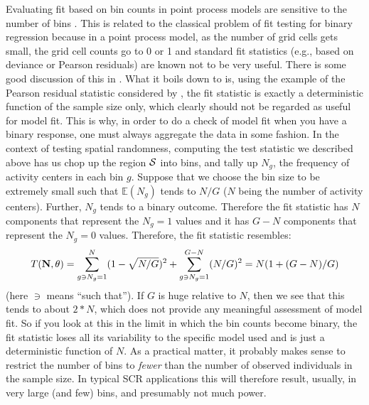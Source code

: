 Evaluating fit based on bin counts in point process models are
sensitive to the number of bins \citep[][p. 87-88]{illian_etal:2008}.
This is related to the classical problem of fit testing for binary
regression because in a point process model, as the number of grid
cells gets small, the grid cell counts go to 0 or 1 and standard fit
statistics (e.g., based on deviance or Pearson residuals) are known
not to be very useful.  There is some good discussion of this in
\citet[][Sec. 4.4.5]{mccullagh_nelder:1989}.
 What it boils down to is, using
the example of the Pearson residual statistic considered by
\citet{mccullagh_nelder:1989}, the fit statistic is exactly a
deterministic function of the sample size only, which clearly should
not be regarded as useful for model fit. This is why, in order to do a
check of model fit when you have a binary response, one must always
aggregate the data in some fashion.  In the context of testing spatial
randomness, computing the test statistic we described above has us chop up the
region ${\cal S}$ into bins, and tally up $N_{g}$, the
frequency of activity centers in each bin $g$.  %
Suppose that we choose the
bin size to be extremely small such that %
$\mathbb{E}(N_{g})$
tends to $N/G$ ($N$ being the number of activity centers).  Further,
$N_{g}$ tends to a binary outcome. Therefore the fit statistic has $N$
components that represent the $N_{g} = 1$ values and it has $G-N$
components that represent the $N_{g} = 0$ values. Therefore, the fit statistic
resembles:
\[
T({\bf N},\theta) = \sum_{g \ni N_{g} = 1}^{N}  (1 - \sqrt{N/G})^2 +
\sum_{g \ni N_{g} = 1}^{G-N} (N/G)^2
 = N(1 + (G-N)/G)
\]
(here $\ni$ means ``such that''). If $G$ is huge
relative to $N$, then we see that this tends to about $2*N$, which
does not provide any meaningful assessment of model fit.  So if you
look at this in the limit in which the bin counts become binary, the
fit statistic loses all its variability to the specific model used and
is just a deterministic function of $N$. As a practical matter, it
probably makes sense to restrict the number of bins to {\it fewer}
than the number of observed individuals in the sample size. In typical
SCR
applications this will therefore result, usually, in very large (and
few) bins, and presumably not much power.


